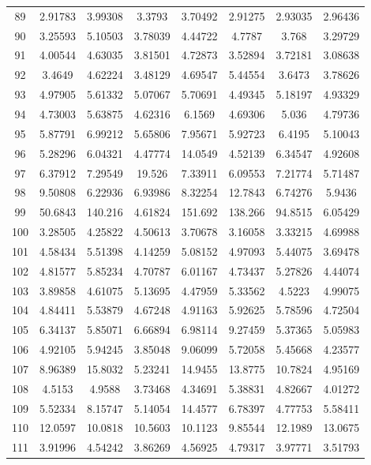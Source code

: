 \begin{figure}
\begin{tabular}{cccccccc}
89 & 2.91783 & 3.99308 & 3.3793 & 3.70492 & 2.91275 & 2.93035 & 2.96436\\
90 & 3.25593 & 5.10503 & 3.78039 & 4.44722 & 4.7787 & 3.768 & 3.29729\\
91 & 4.00544 & 4.63035 & 3.81501 & 4.72873 & 3.52894 & 3.72181 & 3.08638\\
92 & 3.4649 & 4.62224 & 3.48129 & 4.69547 & 5.44554 & 3.6473 & 3.78626\\
93 & 4.97905 & 5.61332 & 5.07067 & 5.70691 & 4.49345 & 5.18197 & 4.93329\\
94 & 4.73003 & 5.63875 & 4.62316 & 6.1569 & 4.69306 & 5.036 & 4.79736\\
95 & 5.87791 & 6.99212 & 5.65806 & 7.95671 & 5.92723 & 6.4195 & 5.10043\\
96 & 5.28296 & 6.04321 & 4.47774 & 14.0549 & 4.52139 & 6.34547 & 4.92608\\
97 & 6.37912 & 7.29549 & 19.526 & 7.33911 & 6.09553 & 7.21774 & 5.71487\\
98 & 9.50808 & 6.22936 & 6.93986 & 8.32254 & 12.7843 & 6.74276 & 5.9436\\
99 & 50.6843 & 140.216 & 4.61824 & 151.692 & 138.266 & 94.8515 & 6.05429\\
100 & 3.28505 & 4.25822 & 4.50613 & 3.70678 & 3.16058 & 3.33215 & 4.69988\\
101 & 4.58434 & 5.51398 & 4.14259 & 5.08152 & 4.97093 & 5.44075 & 3.69478\\
102 & 4.81577 & 5.85234 & 4.70787 & 6.01167 & 4.73437 & 5.27826 & 4.44074\\
103 & 3.89858 & 4.61075 & 5.13695 & 4.47959 & 5.33562 & 4.5223 & 4.99075\\
104 & 4.84411 & 5.53879 & 4.67248 & 4.91163 & 5.92625 & 5.78596 & 4.72504\\
105 & 6.34137 & 5.85071 & 6.66894 & 6.98114 & 9.27459 & 5.37365 & 5.05983\\
106 & 4.92105 & 5.94245 & 3.85048 & 9.06099 & 5.72058 & 5.45668 & 4.23577\\
107 & 8.96389 & 15.8032 & 5.23241 & 14.9455 & 13.8775 & 10.7824 & 4.95169\\
108 & 4.5153 & 4.9588 & 3.73468 & 4.34691 & 5.38831 & 4.82667 & 4.01272\\
109 & 5.52334 & 8.15747 & 5.14054 & 14.4577 & 6.78397 & 4.77753 & 5.58411\\
110 & 12.0597 & 10.0818 & 10.5603 & 10.1123 & 9.85544 & 12.1989 & 13.0675\\
111 & 3.91996 & 4.54242 & 3.86269 & 4.56925 & 4.79317 & 3.97771 & 3.51793\\

\end{tabular}
\end{figure}
